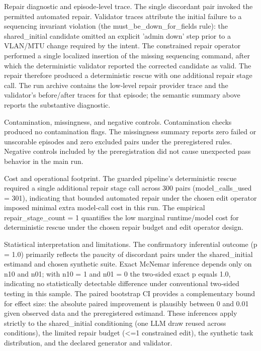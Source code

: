 \documentclass[conference]{IEEEtran}
\begin{document}
Repair diagnostic and episode‑level trace. The single discordant pair invoked the permitted automated repair. Validator traces attribute the initial failure to a sequencing invariant violation (the must\_be\_down\_for\_fields rule): the shared\_initial candidate omitted an explicit 'admin down' step prior to a VLAN/MTU change required by the intent. The constrained repair operator performed a single localized insertion of the missing sequencing command, after which the deterministic validator reported the corrected candidate as valid. The repair therefore produced a deterministic rescue with one additional repair stage call. The run archive contains the low‑level repair provider trace and the validator's before/after traces for that episode; the semantic summary above reports the substantive diagnostic.

Contamination, missingness, and negative controls. Contamination checks produced no contamination flags. The missingness summary reports zero failed or unscorable episodes and zero excluded pairs under the preregistered rules. Negative controls included by the preregistration did not cause unexpected pass behavior in the main run.

Cost and operational footprint. The guarded pipeline's deterministic rescue required a single additional repair stage call across 300 pairs (model\_calls\_used = 301), indicating that bounded automated repair under the chosen edit operator imposed minimal extra model‑call cost in this run. The empirical repair\_stage\_count = 1 quantifies the low marginal runtime/model cost for deterministic rescue under the chosen repair budget and edit operator design.

Statistical interpretation and limitations. The confirmatory inferential outcome (p = 1.0) primarily reflects the paucity of discordant pairs under the shared\_initial estimand and chosen synthetic suite. Exact McNemar inference depends only on n10 and n01; with n10 = 1 and n01 = 0 the two‑sided exact p equals 1.0, indicating no statistically detectable difference under conventional two‑sided testing in this sample. The paired bootstrap CI provides a complementary bound for effect size: the absolute paired improvement is plausibly between 0 and 0.01 given observed data and the preregistered estimand. These inferences apply strictly to the shared\_initial conditioning (one LLM draw reused across conditions), the limited repair budget (<=1 constrained edit), the synthetic task distribution, and the declared generator and validator.
\end{document}
